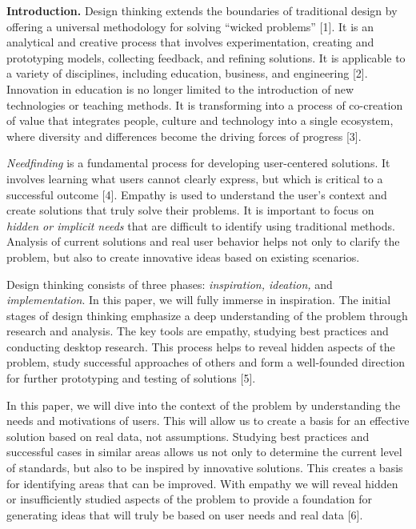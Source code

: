 \begin{multicols}{2}
{\bfseries Introduction.} Design thinking extends the boundaries of
traditional design by offering a universal methodology for solving
``wicked problems'' {[}1{]}. It is an analytical and creative process
that involves experimentation, creating and prototyping models,
collecting feedback, and refining solutions. It is applicable to a
variety of disciplines, including education, business, and engineering
{[}2{]}. Innovation in education is no longer limited to the
introduction of new technologies or teaching methods. It is transforming
into a process of co-creation of value that integrates people, culture
and technology into a single ecosystem, where diversity and differences
become the driving forces of progress {[}3{]}.

\emph{Needfinding} is a fundamental process for developing user-centered
solutions. It involves learning what users cannot clearly express, but
which is critical to a successful outcome {[}4{]}. Empathy is used to
understand the user's context and create solutions that truly solve
their problems. It is important to focus on \emph{hidden or implicit
needs} that are difficult to identify using traditional methods.
Analysis of current solutions and real user behavior helps not only to
clarify the problem, but also to create innovative ideas based on
existing scenarios.

Design thinking consists of three phases: \emph{inspiration, ideation,}
and \emph{implementation}. In this paper, we will fully immerse in
inspiration. The initial stages of design thinking emphasize a deep
understanding of the problem through research and analysis. The key
tools are empathy, studying best practices and conducting desktop
research. This process helps to reveal hidden aspects of the problem,
study successful approaches of others and form a well-founded direction
for further prototyping and testing of solutions {[}5{]}.

In this paper, we will dive into the context of the problem by
understanding the needs and motivations of users. This will allow us to
create a basis for an effective solution based on real data, not
assumptions. Studying best practices and successful cases in similar
areas allows us not only to determine the current level of standards,
but also to be inspired by innovative solutions. This creates a basis
for identifying areas that can be improved. With empathy we will reveal
hidden or insufficiently studied aspects of the problem to provide a
foundation for generating ideas that will truly be based on user needs
and real data {[}6{]}.


\end{multicols}
